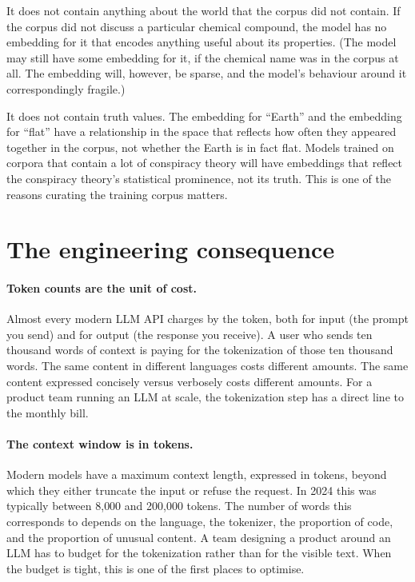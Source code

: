 It does not contain anything about the world that the corpus
did not contain. If the corpus did not discuss a particular
chemical compound, the model has no embedding for it that
encodes anything useful about its properties. (The model may
still have some embedding for it, if the chemical name was in
the corpus at all. The embedding will, however, be sparse,
and the model's behaviour around it correspondingly fragile.)

It does not contain truth values. The embedding for ``Earth''
and the embedding for ``flat'' have a relationship in the space
that reflects how often they appeared together in the corpus,
not whether the Earth is in fact flat. Models trained on
corpora that contain a lot of conspiracy theory will have
embeddings that reflect the conspiracy theory's statistical
prominence, not its truth. This is one of the reasons curating
the training corpus matters.

\section{The engineering consequence}

\paragraph{Token counts are the unit of cost.} Almost every
modern LLM API charges by the token, both for input (the prompt
you send) and for output (the response you receive). A user
who sends ten thousand words of context is paying for the
tokenization of those ten thousand words. The same content in
different languages costs different amounts. The same content
expressed concisely versus verbosely costs different amounts.
For a product team running an LLM at scale, the tokenization
step has a direct line to the monthly bill.

\paragraph{The context window is in tokens.} Modern models have
a maximum context length, expressed in tokens, beyond which they
either truncate the input or refuse the request. In 2024 this
was typically between 8{,}000 and 200{,}000 tokens. The number
of words this corresponds to depends on the language, the
tokenizer, the proportion of code, and the proportion of
unusual content. A team designing a product around an LLM has to
budget for the tokenization rather than for the visible text.
When the budget is tight, this is one of the first places to
optimise.


